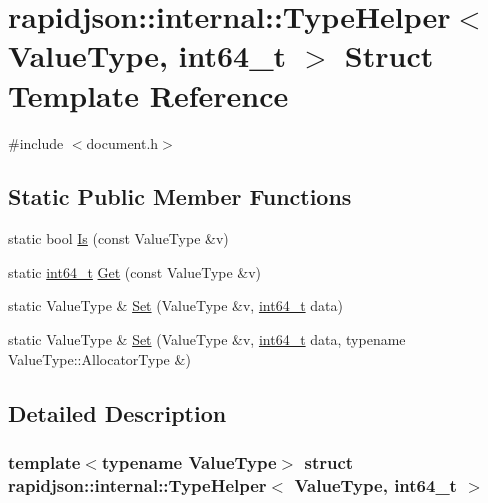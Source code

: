 \hypertarget{structrapidjson_1_1internal_1_1_type_helper_3_01_value_type_00_01int64__t_01_4}{}\section{rapidjson\+::internal\+::Type\+Helper$<$ Value\+Type, int64\+\_\+t $>$ Struct Template Reference}
\label{structrapidjson_1_1internal_1_1_type_helper_3_01_value_type_00_01int64__t_01_4}


{\ttfamily \#include $<$document.\+h$>$}

\subsection*{Static Public Member Functions}
\begin{DoxyCompactItemize}
\item 
static bool \mbox{\hyperlink{structrapidjson_1_1internal_1_1_type_helper_3_01_value_type_00_01int64__t_01_4_a7cfea249bba4f48c9494808cee3b13c9}{Is}} (const Value\+Type \&v)
\item 
static \mbox{\hyperlink{stdint_8h_a414156feea104f8f75b4ed9e3121b2f6}{int64\+\_\+t}} \mbox{\hyperlink{structrapidjson_1_1internal_1_1_type_helper_3_01_value_type_00_01int64__t_01_4_a9bc05e62fbd91d74f14ff1302ac28618}{Get}} (const Value\+Type \&v)
\item 
static Value\+Type \& \mbox{\hyperlink{structrapidjson_1_1internal_1_1_type_helper_3_01_value_type_00_01int64__t_01_4_a5351e560f637ba8726420c5cc1e1051d}{Set}} (Value\+Type \&v, \mbox{\hyperlink{stdint_8h_a414156feea104f8f75b4ed9e3121b2f6}{int64\+\_\+t}} data)
\item 
static Value\+Type \& \mbox{\hyperlink{structrapidjson_1_1internal_1_1_type_helper_3_01_value_type_00_01int64__t_01_4_ac7c3c6f948211da66ab9688ed198c252}{Set}} (Value\+Type \&v, \mbox{\hyperlink{stdint_8h_a414156feea104f8f75b4ed9e3121b2f6}{int64\+\_\+t}} data, typename Value\+Type\+::\+Allocator\+Type \&)
\end{DoxyCompactItemize}


\subsection{Detailed Description}
\subsubsection*{template$<$typename Value\+Type$>$\newline
struct rapidjson\+::internal\+::\+Type\+Helper$<$ Value\+Type, int64\+\_\+t $>$}



